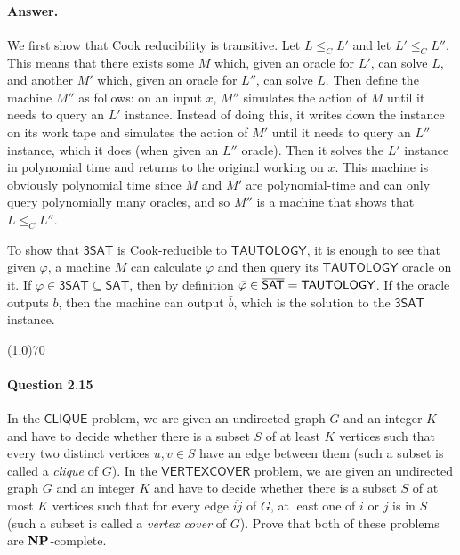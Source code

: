 \paragraph{Answer.} We first show that Cook reducibility is transitive. Let $L\leq_C L'$ and let $L'\leq_C L''$. This means that there exists some $M$ which, given an oracle for $L'$, can solve $L$, and another $M'$ which, given an oracle for $L''$, can solve $L$. Then define the machine $M''$ as follows: on an input $x$, $M''$ simulates the action of $M$ until it needs to query an $L'$ instance. Instead of doing this, it writes down the instance on its work tape and simulates the action of $M'$ until it needs to query an $L''$ instance, which it does (when given an $L''$ oracle). Then it solves the $L'$ instance in polynomial time and returns to the original working on $x$. This machine is obviously polynomial time since $M$ and $M'$ are polynomial-time and can only query polynomially many oracles, and so $M''$ is a machine that shows that $L\leq_C L''$.

To show that $\mathsf{3SAT}$ is Cook-reducible to $\mathsf{TAUTOLOGY}$, it is enough to see that given $\varphi$, a machine $M$ can calculate $\bar{\varphi}$ and then query its $\mathsf{TAUTOLOGY}$ oracle on it. If $\varphi\in\mathsf{3SAT}\subseteq\mathsf{SAT}$, then by definition $\bar{\varphi}\in\overline{\mathsf{SAT}}=\mathsf{TAUTOLOGY}$. If the oracle outputs $b$, then the machine can output $\bar{b}$, which is the solution to the $\mathsf{3SAT}$ instance.

\begin{center}
	\line(1,0){70}
\end{center}

\paragraph{Question 2.15} In the $\mathsf{CLIQUE}$ problem, we are given an undirected graph $G$ and an integer $K$ and have to decide whether there is a subset $S$ of at least $K$ vertices such that every two distinct vertices $u,v\in S$ have an edge between them (such a subset is called a \textit{clique} of $G$). In the $\mathsf{VERTEX COVER}$ problem, we are given an undirected graph $G$ and an integer $K$ and have to decide whether there is a subset $S$ of at most $K$ vertices such that for every edge $\overline{ij}$ of $G$, at least one of $i$ or $j$ is in $S$ (such a subset is called a \textit{vertex cover} of $G$). Prove that both of these problems are $\mathbf{NP}$-complete.

